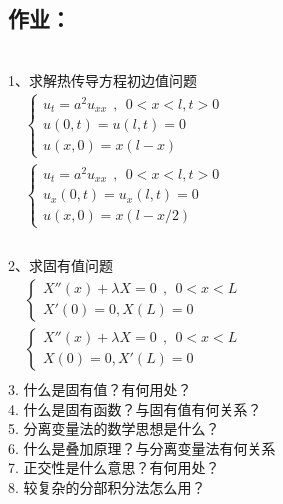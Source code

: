 \subsection{作业：}
~~~\hspace*{\fill} \\
1、求解热传导方程初边值问题\\
	$\begin{array}{lllllllll}
	& \begin{cases}
		u_{t} =a^2u_{xx} ~~,~~ 0<x<l, t>0\\
		u(0,t) =u(l,t)=0 \\
		u(x,0) =x (l-x)
	    \end{cases}\\	
	&\begin{cases}
		u_{t} =a^2u_{xx} ~~,~~ 0<x<l, t>0\\
		u_x(0,t) =u_x(l,t)=0 \\
		u(x,0) =x(l-x/2)
	\end{cases} \\	
\end{array}$ \\ 

 ~~~\hspace*{\fill} \\
2、求固有值问题\\
	$\begin{array}{lllllllll}
	& \begin{cases}
		X'' (x)  + \lambda X =0   ~~,~~ 0<x<L\\
        X' (0) =0, X (L) =0
	\end{cases}\\	
	&\begin{cases}
		X'' (x)  + \lambda X =0   ~~,~~ 0<x<L\\
       X (0) =0, X' (L) =0
	\end{cases} \\	
\end{array}$ \\ 
3. 什么是固有值？有何用处？
\\
4. 什么是固有函数？与固有值有何关系？ 
\\
5. 分离变量法的数学思想是什么？
\\
6. 什么是叠加原理？与分离变量法有何关系
\\
7. 正交性是什么意思？有何用处？
\\
8. 较复杂的分部积分法怎么用？
\\


